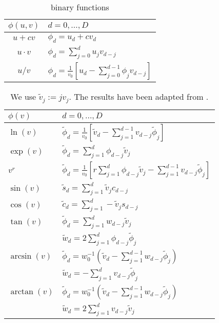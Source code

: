 \documentclass[a4paper,12pt,twoside]{article}
\begin{document}
\begin{table}[!h]
\centering
\begin{tabular}{| c | l |}
\hline
$\phi(u,v)$  & $d = 0,\dots,D$\\
\hline
$u + cv$ & $\phi_d = u_d + c v_d$ \\
$u \cdot v $ & $\phi_d = \sum_{j=0}^d u_j  v_{d-j}$ \\
$u / v $ & $\phi_d = \frac{1}{v_0} \left[ u_d - \sum_{j=0}^{d-1} \phi_j v_{d-j} \right]$\\
\hline
\end{tabular}

\caption{\label{tab:taylor_arithmetic_binary}
binary functions
}
\end{table}
\begin{table}[!h]
\centering
\begin{tabular}{| l | l |}
\hline 
$\phi(v)$  & $d = 0,\dots,D$\\
\hline \hline
$\ln(v)$ & $ \tilde \phi_d = \frac{1}{v_0} \left[ \tilde v_d - \sum_{j=1}^{d-1} v_{d-j} \tilde \phi_j \right]$ \\
\hline
$\exp(v) $ & $ \tilde \phi_d = \sum_{j=1}^d \phi_{d-j} \tilde v_j$ \\
\hline
$ v^r$ & $ \tilde \phi_d = \frac{1}{v_0} \left[ r \sum_{j=1}^d \phi_{d-j} \tilde v_j - \sum_{j=1}^{d-1} v_{d-j} \tilde \phi_j \right]$\\
\hline
$\sin(v)$ & $ \tilde s_d = \sum_{j=1}^d \tilde v_j c_{d-j}$ \\
$\cos(v)$ & $ \tilde c_d = \sum_{j=1}^d - \tilde  v_j s_{d-j} $\\
\hline
$\tan(v)$ & $\tilde  \phi_d = \sum_{j=1}^d w_{d-j} \tilde v_j $ \\
& $\tilde w_d = 2 \sum_{j=1}^d \phi_{d-j} \tilde \phi_j$ \\
\hline
$\arcsin(v)$ & $ \tilde \phi_d = w_0^{-1} \left( \tilde v_d - \sum_{j=1}^{d-1} w_{d-j} \tilde \phi_j \right)$\\
& $ \tilde w_d = - \sum_{j=1}^d v_{d-j} \tilde \phi_j $ \\
\hline
$\arctan(v)$ & $ \tilde \phi_d = w_0^{-1} \left( \tilde v_d - \sum_{j=1}^{d-1} w_{d-j} \tilde \phi_j \right)$\\
& $ \tilde w_d = 2 \sum_{j=1}^d v_{d-j} \tilde v_j $ \\
\hline
\end{tabular}
\caption{\label{tab:taylor_arithmetic_univariate}
We use $\tilde v_j := j v_j$. The results have been adapted from \cite{Griewank2008EDP,Neidinger2005DfC}.
}
\end{table}
 


% 





\end{document}
